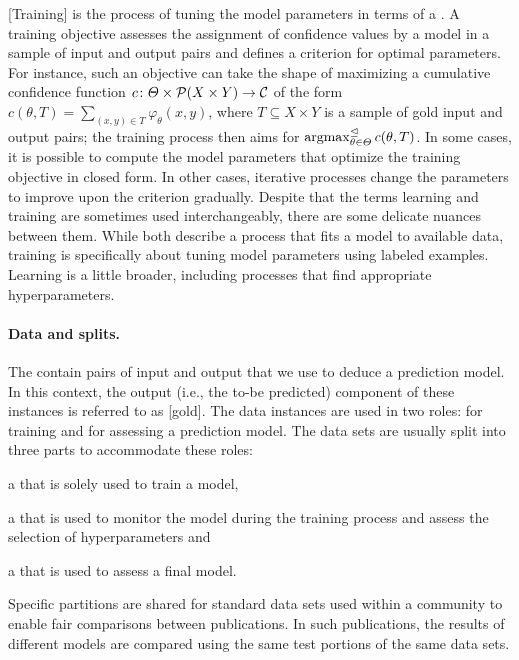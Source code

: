 \documentclass[../document.tex]{subfiles}
\begin{document}
    [Training] is the process of tuning the model parameters in terms of a .
    A training objective assesses the assignment of confidence values by a model in a sample of input and output pairs and defines a criterion for optimal parameters.
    For instance, such an objective can take the shape of maximizing a cumulative confidence function \(c\colon \varTheta \times \mathcal{P}(X \times Y) \to \mathcal{C}\) of the form \(c(\theta, T) = \sum_{(x,y) \in T} \varphi_\theta(x, y)\), where \(T \subseteq X \times Y\) is a sample of gold input and output pairs; the training process then aims for \(\operatorname{arg max}^{\mathrel{\unlhd}}_{\theta \in \varTheta} c(\theta, T)\).
    In some cases, it is possible to compute the model parameters that optimize the training objective in closed form.
    In other cases, iterative processes change the parameters to improve upon the criterion gradually.
    Despite that the terms learning and training are sometimes used interchangeably, there are some delicate nuances between them.
    While both describe a process that fits a model to available data, training is specifically about tuning model parameters using labeled examples.
    Learning is a little broader, including processes that find appropriate hyperparameters.

    \paragraph{Data and splits.}
    The  contain pairs of input and output that we use to deduce a prediction model.
    In this context, the output (i.e., the to-be predicted) component of these instances is referred to as [gold].
    The data instances are used in two roles: for training and for assessing a prediction model.
    The data sets are usually split into three parts to accommodate these roles:
    \begin{inparaenum}
        \item a  that is solely used to train a model,
        \item a  that is used to monitor the model during the training process and assess the selection of hyperparameters and
        \item a  that is used to assess a final model.
    \end{inparaenum}
    Specific partitions are shared for standard data sets used within a community to enable fair comparisons between publications.
    In such publications, the results of different models are compared using the same test portions of the same data sets.
\end{document}
